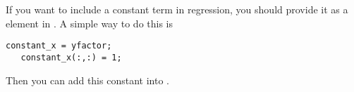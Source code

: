 \iffalse
  In matrix form, the regression is (at a period)
  \[
     \bm{W}^{\frac{1}{2}}\bm{y} = \bm{W}^{\frac{1}{2}}\bm{X}\bm{\beta} + \bm{\epsilon},
  \]
  where
  \begin{equation*}
     \bm{W}^{\frac{1}{2}} = \begin{pmatrix}
                             \sqrt{w_1} & &\\
                              &\ddots &\\
                              & &\sqrt{w_N} \\
                            \end{pmatrix},\;
     \bm{y} = \begin{pmatrix} y_1\\
                              \vdots\\
                              y_N\\
              \end{pmatrix},\;
     \bm{X} = \begin{pmatrix}
               x_{11} & \cdots & x_{1K}\\
               \vdots & \ddots & \vdots\\
               x_{N1} & \cdots & x_{NK}\\
              \end{pmatrix},\;
     \bm{\beta} = \begin{pmatrix}
                  \beta_1\\
                  \vdots\\
                  \beta_K
                  \end{pmatrix}
     \bm{\epsilon} = \begin{pmatrix}
                     \epsilon_1\\
                     \vdots\\
                     \epsilon_N
                    \end{pmatrix},
  \end{equation*}
\fi  

  If you want to include a constant term in regression, you should provide it as a \myfints{} element
  in . A simple way to do this is
  \begin{lstlisting}[numbers=none]
   constant_x = yfactor;
   constant_x(:,:) = 1;
  \end{lstlisting}
  Then you can add this constant \myfints{} into .


